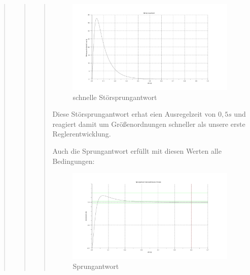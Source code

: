 \begin{quote}
\begin{quote}
\begin{quote}
			\begin{figure}[H]
            \centering
                \includegraphics[scale=0.5, trim = 0cm 0cm 0cm 0cm, clip]{./Bilder/Stoersprungantwortschnell}
                    \caption{schnelle Störsprungantwort}
                    \label{fig:Stoersprungantwortschnell}
            \end{figure}
            
            Diese Störsprungantwort erhat eien Ausregelzeit von $0,5s$ und reagiert damit um Größenordnungen schneller
            als unsere erste Reglerentwicklung.\vspace{1em}
            
            Auch die Sprungantwort erfüllt mit diesen Werten alle Bedingungen:
            \begin{figure}[H]
            \centering
                \includegraphics[scale=0.5, trim = 0cm 0cm 0cm 0cm, clip]{./Bilder/Sprungantwortschnell}
                    \caption{Sprungantwort}
                    \label{fig:./Bilder/Sprungantwortschnell}
            \end{figure}
    

\end{quote}
\end{quote}
\end{quote}
